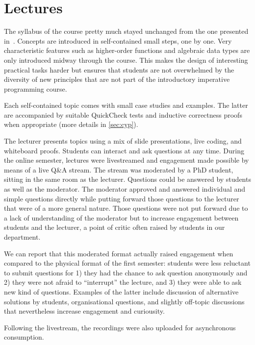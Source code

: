 \section{Lectures}

The syllabus of the course pretty much stayed unchanged from the one presented in~\citep{next_1100}.
Concepts are introduced in self-contained small steps, one by one.
Very characteristic features such as
higher-order functions and algebraic data types are
only introduced midway through the course.
This makes the design of interesting practical tasks harder
but ensures that students are not overwhelmed by the diversity
of new principles that are not part of the introductory imperative programming course.

Each self-contained topic comes with small case studies and examples.
The latter are accompanied by suitable QuickCheck tests
and inductive correctness proofs when appropriate (more details in \cref{sec:cyp}).

The lecturer presents topics using a mix of
slide presentations,
live coding, and whiteboard proofs.
Students can interact and ask questions at any time.
During the online semester,
lectures were livestreamed and
engagement made possible by means of a live Q\&A stream.
The stream was moderated by a PhD student,
sitting in the same room as the lecturer.
Questions could be answered by students as well as the moderator.
The moderator approved and answered individual and simple questions directly while putting forward those questions to the lecturer
that were of a more general nature.
Those questions were not put forward due to a lack of understanding of the moderator
but to increase engagement between students and the lecturer,
a point of critic often raised by students in our department.

We can report that this moderated format actually raised engagement when compared to the physical format of the first semester:
students were less reluctant to submit questions for
1) they had the chance to ask question anonymously and
2) they were not afraid to ``interrupt'' the lecture, and
3) they were able to ask new kind of questions.
Examples of the latter include discussion of alternative solutions by students,
organisational questions,
and slightly off-topic discussions that nevertheless increase engagement and curiousity.


Following the livestream,
the recordings were also uploaded for asynchronous consumption.

